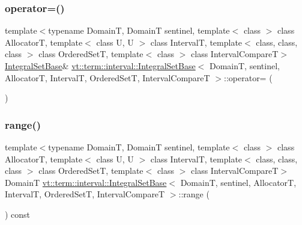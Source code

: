 \mbox{\label{structvt_1_1term_1_1interval_1_1_integral_set_base_af96e31d4224f965ce41938b031cc9589}} 
\subsubsection{\texorpdfstring{operator=()}{operator=()}}
{\footnotesize\ttfamily template$<$typename DomainT, DomainT sentinel, template$<$ class $>$ class AllocatorT, template$<$ class U, U $>$ class IntervalT, template$<$ class, class, class $>$ class Ordered\+SetT, template$<$ class $>$ class Interval\+CompareT$>$ \\
\hyperlink{structvt_1_1term_1_1interval_1_1_integral_set_base}{Integral\+Set\+Base}\& \hyperlink{structvt_1_1term_1_1interval_1_1_integral_set_base}{vt\+::term\+::interval\+::\+Integral\+Set\+Base}$<$ DomainT, sentinel, AllocatorT, IntervalT, Ordered\+SetT, Interval\+CompareT $>$\+::operator= (\begin{DoxyParamCaption}\item[{\hyperlink{structvt_1_1term_1_1interval_1_1_integral_set_base}{Integral\+Set\+Base}$<$ DomainT, sentinel, AllocatorT, IntervalT, Ordered\+SetT, Interval\+CompareT $>$ const \&}]{ }\end{DoxyParamCaption})\hspace{0.3cm}{\ttfamily [default]}}

\mbox{\label{structvt_1_1term_1_1interval_1_1_integral_set_base_a9c808e539cad61d40a062317e983ba74}} 
\subsubsection{\texorpdfstring{range()}{range()}}
{\footnotesize\ttfamily template$<$typename DomainT, DomainT sentinel, template$<$ class $>$ class AllocatorT, template$<$ class U, U $>$ class IntervalT, template$<$ class, class, class $>$ class Ordered\+SetT, template$<$ class $>$ class Interval\+CompareT$>$ \\
DomainT \hyperlink{structvt_1_1term_1_1interval_1_1_integral_set_base}{vt\+::term\+::interval\+::\+Integral\+Set\+Base}$<$ DomainT, sentinel, AllocatorT, IntervalT, Ordered\+SetT, Interval\+CompareT $>$\+::range (\begin{DoxyParamCaption}{ }\end{DoxyParamCaption}) const\hspace{0.3cm}{\ttfamily [inline]}}

